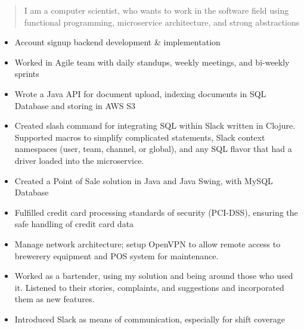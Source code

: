 \documentclass[10pt,a4paper]{altacv}
\begin{document}


\begin{fullwidth}
\makecvheader
\end{fullwidth}

\begin{quote}
I am a computer scientist, who wants to work in the software field using functional programming, microservice architecture, and strong abstractions
\end{quote}




\begin{itemize}
    \item Account signup backend development \& implementation
    \item Worked in Agile team with daily standups, weekly meetings, and bi-weekly sprints
    \item Wrote a Java API for document upload, indexing documents in SQL Database and storing in AWS S3
    \item Created slash command for integrating SQL within Slack written in Clojure. Supported macros to simplify complicated statements, Slack context namespaces (user, team, channel, or global), and any SQL flavor that had a driver loaded into the microservice.
\end{itemize}

\bigskip


\divider

\begin{itemize}
    \item Created a Point of Sale solution in Java and Java Swing, with MySQL Database
    \item Fulfilled credit card processing standards of security (PCI-DSS), ensuring the safe handling of credit card data
    \item Manage network architecture; setup OpenVPN to allow remote access to brewerery equipment and POS system for maintenance.
    \item Worked as a bartender, using my solution and being around those who used it. Listened to their stories, complaints, and suggestions and incorporated them as new features.
    \item Introduced Slack as means of communication, especially for shift coverage
\end{itemize}

\bigskip

\end{document}
